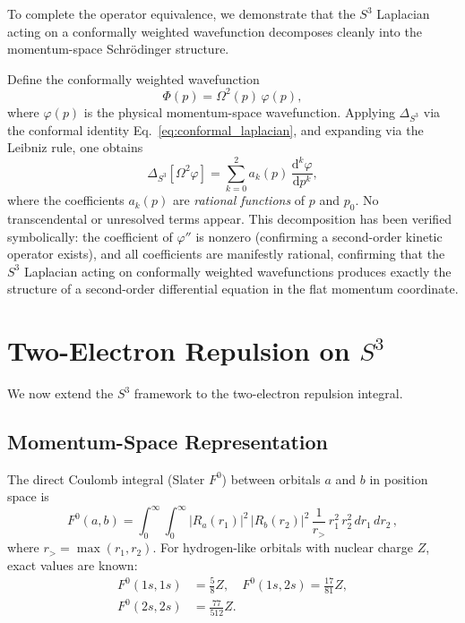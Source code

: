 \documentclass[aps,pra,twocolumn,superscriptaddress,longbibliography]{revtex4-2}
\begin{document}
To complete the operator equivalence, we demonstrate that the $S^3$ Laplacian acting on a conformally weighted wavefunction decomposes cleanly into the momentum-space Schr\"odinger structure.

Define the conformally weighted wavefunction
\begin{equation}
\Phi(p) = \Omega^2(p)\,\varphi(p),
\label{eq:conformal_wf}
\end{equation}
where $\varphi(p)$ is the physical momentum-space wavefunction. Applying $\Delta_{S^3}$ via the conformal identity Eq.~\eqref{eq:conformal_laplacian}, and expanding via the Leibniz rule, one obtains
\begin{equation}
\Delta_{S^3}[\Omega^2 \varphi] = \sum_{k=0}^{2} a_k(p)\, \frac{\mathrm{d}^k \varphi}{\mathrm{d}p^k},
\label{eq:decomposition}
\end{equation}
where the coefficients $a_k(p)$ are \textit{rational functions} of $p$ and $p_0$. No transcendental or unresolved terms appear. This decomposition has been verified symbolically: the coefficient of $\varphi''$ is nonzero (confirming a second-order kinetic operator exists), and all coefficients are manifestly rational, confirming that the $S^3$ Laplacian acting on conformally weighted wavefunctions produces exactly the structure of a second-order differential equation in the flat momentum coordinate.


\section{Two-Electron Repulsion on $S^3$}
\label{sec:vee_s3}

We now extend the $S^3$ framework to the two-electron repulsion
integral.

\subsection{Momentum-Space Representation}

The direct Coulomb integral (Slater $F^0$) between orbitals $a$ and $b$
in position space is
\begin{equation}
  F^0(a,b) = \int_0^\infty \!\!\int_0^\infty
  |R_a(r_1)|^2 \, |R_b(r_2)|^2 \, \frac{1}{r_>} \,
  r_1^2 \, r_2^2 \, dr_1 \, dr_2 \,,
  \label{eq:slater_f0}
\end{equation}
where $r_> = \max(r_1, r_2)$. For hydrogen-like orbitals with nuclear
charge $Z$, exact values are known:
\begin{align}
  F^0(1s,1s) &= \tfrac{5}{8}Z, \quad
  F^0(1s,2s) = \tfrac{17}{81}Z, \nonumber\\
  F^0(2s,2s) &= \tfrac{77}{512}Z.
  \label{eq:slater_exact}
\end{align}
\end{document}

